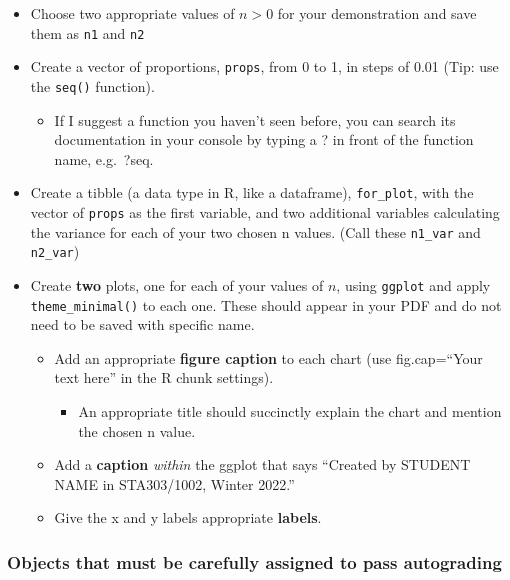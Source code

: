 \documentclass[
  openany]{book}
\providecommand{\tightlist}{%
  \setlength{\itemsep}{0pt}\setlength{\parskip}{0pt}}
\begin{document}
\begin{itemize}
\item
  Choose two appropriate values of \(n>0\) for your demonstration and save them as \texttt{n1} and \texttt{n2}
\item
  Create a vector of proportions, \texttt{props}, from 0 to 1, in steps of 0.01 (Tip: use the \texttt{seq()} function).

  \begin{itemize}
  \tightlist
  \item
    If I suggest a function you haven't seen before, you can search its documentation in your console by typing a ? in front of the function name, e.g.~?seq.
  \end{itemize}
\item
  Create a tibble (a data type in R, like a dataframe), \texttt{for\_plot}, with the vector of \texttt{props} as the first variable, and two additional variables calculating the variance for each of your two chosen n values. (Call these \texttt{n1\_var} and \texttt{n2\_var})
\item
  Create \textbf{two} plots, one for each of your values of \(n\), using \texttt{ggplot} and apply \texttt{theme\_minimal()} to each one. These should appear in your PDF and do not need to be saved with specific name.

  \begin{itemize}
  \item
    Add an appropriate \textbf{figure caption} to each chart (use fig.cap=``Your text here'' in the R chunk settings).

    \begin{itemize}
    \tightlist
    \item
      An appropriate title should succinctly explain the chart and mention the chosen n value.
    \end{itemize}
  \item
    Add a \textbf{caption} \emph{within} the ggplot that says ``Created by STUDENT NAME in STA303/1002, Winter 2022.''
  \item
    Give the x and y labels appropriate \textbf{labels}.
  \end{itemize}
\end{itemize}

\hypertarget{objects-that-must-be-carefully-assigned-to-pass-autograding}{%
\subsubsection{Objects that must be carefully assigned to pass autograding}\label{objects-that-must-be-carefully-assigned-to-pass-autograding}}
\end{document}
